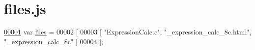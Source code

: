 \hypertarget{files_8js_source}{\section{files.\+js}
\label{files_8js_source}
}

\begin{DoxyCode}
\hypertarget{files_8js_source_l00001}{}\hyperlink{files_8js_a0742cac2750bccc2d88ac080fb9daa22}{00001} var \hyperlink{files_8js_a0742cac2750bccc2d88ac080fb9daa22}{files} =
00002 [
00003     [ \textcolor{stringliteral}{"ExpressionCalc.c"}, \textcolor{stringliteral}{"\_expression\_calc\_8c.html"}, \textcolor{stringliteral}{"\_expression\_calc\_8c"} ]
00004 ];
\end{DoxyCode}
